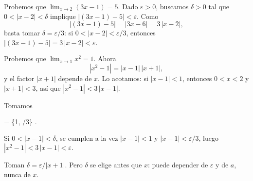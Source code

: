 %

\begin{frame}

\begin{example}
Probemos que $\lim_{x \to 2} (3x - 1) = 5$. Dado $\varepsilon > 0$, buscamos
$\delta > 0$ tal que $0 < |x - 2| < \delta$ implique
$|(3x - 1) - 5| < \varepsilon$. Como
\[
  |(3x - 1) - 5| = |3x - 6| = 3\,|x - 2| ,
\]
basta tomar $\delta = \varepsilon / 3$: si $0 < |x - 2| < \varepsilon/3$,
entonces $|(3x - 1) - 5| = 3\,|x - 2| < \varepsilon$.
\end{example}

\end{frame}

\begin{frame}

\begin{example}
Probemos que $\lim_{x \to 1} x^2 = 1$. Ahora
\[
  |x^2 - 1| = |x - 1|\,|x + 1| ,
\]
y el factor $|x + 1|$ depende de $x$. Lo acotamos: si $|x - 1| < 1$, entonces
$0 < x < 2$ y $|x + 1| < 3$, así que $|x^2 - 1| < 3\,|x - 1|$.

\dpause

Tomamos
\begin{keyformula}
  \delta = \min\{1, \varepsilon/3\} .
\end{keyformula}
Si $0 < |x - 1| < \delta$, se cumplen a la vez $|x - 1| < 1$ y
$|x - 1| < \varepsilon/3$, luego $|x^2 - 1| < 3\,|x - 1| < \varepsilon$.
\end{example}

\begin{commonmistake}
Toman $\delta = \varepsilon / |x + 1|$. Pero $\delta$ se elige antes que $x$:
puede depender de $\varepsilon$ y de $a$, nunca de $x$.
\end{commonmistake}
\end{frame}
